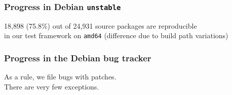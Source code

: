 \documentclass[14pt,aspectratio=169]{beamer}
\begin{document}
\begin{frame}
 \frametitle{Progress in Debian \texttt{unstable}}
 \begin{center}
  \footnotesize{18,898 (75.8\%) out of 24,931 source packages are reproducible \\
    in our test framework on \texttt{amd64}} (difference due to build path variations)
  \vfill
 \end{center}
\end{frame}


\begin{frame}
 \frametitle{Progress in the Debian bug tracker}
 \begin{center}
  \footnotesize{As a rule, we file bugs with patches. \\
  There are very few exceptions.}
  \vfill
 \end{center}
\end{frame}
\end{document}
